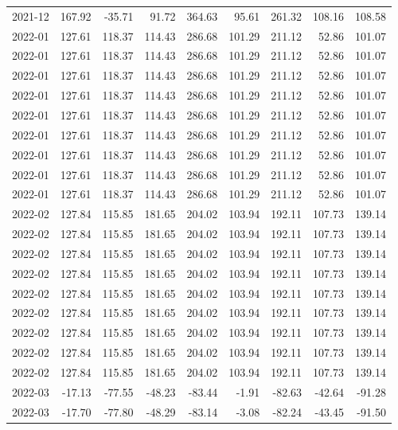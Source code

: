 \begin{table}[ht]
\begin{tabular}{lrrrrrrrr}
  2021-12 & 167.92 & -35.71 & 91.72 & 364.63 & 95.61 & 261.32 & 108.16 & 108.58 \\ 
  2022-01 & 127.61 & 118.37 & 114.43 & 286.68 & 101.29 & 211.12 & 52.86 & 101.07 \\ 
  2022-01 & 127.61 & 118.37 & 114.43 & 286.68 & 101.29 & 211.12 & 52.86 & 101.07 \\ 
  2022-01 & 127.61 & 118.37 & 114.43 & 286.68 & 101.29 & 211.12 & 52.86 & 101.07 \\ 
  2022-01 & 127.61 & 118.37 & 114.43 & 286.68 & 101.29 & 211.12 & 52.86 & 101.07 \\ 
  2022-01 & 127.61 & 118.37 & 114.43 & 286.68 & 101.29 & 211.12 & 52.86 & 101.07 \\ 
  2022-01 & 127.61 & 118.37 & 114.43 & 286.68 & 101.29 & 211.12 & 52.86 & 101.07 \\ 
  2022-01 & 127.61 & 118.37 & 114.43 & 286.68 & 101.29 & 211.12 & 52.86 & 101.07 \\ 
  2022-01 & 127.61 & 118.37 & 114.43 & 286.68 & 101.29 & 211.12 & 52.86 & 101.07 \\ 
  2022-01 & 127.61 & 118.37 & 114.43 & 286.68 & 101.29 & 211.12 & 52.86 & 101.07 \\ 
  2022-02 & 127.84 & 115.85 & 181.65 & 204.02 & 103.94 & 192.11 & 107.73 & 139.14 \\ 
  2022-02 & 127.84 & 115.85 & 181.65 & 204.02 & 103.94 & 192.11 & 107.73 & 139.14 \\ 
  2022-02 & 127.84 & 115.85 & 181.65 & 204.02 & 103.94 & 192.11 & 107.73 & 139.14 \\ 
  2022-02 & 127.84 & 115.85 & 181.65 & 204.02 & 103.94 & 192.11 & 107.73 & 139.14 \\ 
  2022-02 & 127.84 & 115.85 & 181.65 & 204.02 & 103.94 & 192.11 & 107.73 & 139.14 \\ 
  2022-02 & 127.84 & 115.85 & 181.65 & 204.02 & 103.94 & 192.11 & 107.73 & 139.14 \\ 
  2022-02 & 127.84 & 115.85 & 181.65 & 204.02 & 103.94 & 192.11 & 107.73 & 139.14 \\ 
  2022-02 & 127.84 & 115.85 & 181.65 & 204.02 & 103.94 & 192.11 & 107.73 & 139.14 \\ 
  2022-02 & 127.84 & 115.85 & 181.65 & 204.02 & 103.94 & 192.11 & 107.73 & 139.14 \\ 
  2022-03 & -17.13 & -77.55 & -48.23 & -83.44 & -1.91 & -82.63 & -42.64 & -91.28 \\ 
  2022-03 & -17.70 & -77.80 & -48.29 & -83.14 & -3.08 & -82.24 & -43.45 & -91.50 \\ 

\end{tabular}
\end{table}
